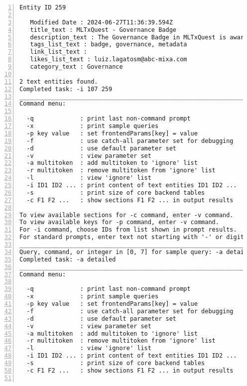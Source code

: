 \documentclass[10pt]{article}
\begin{document}
{\begin{lstlisting}[numbers=left,basicstyle=\ttfamily\footnotesize, frame=none]
Entity ID 259

   Modified Date : 2024-06-27T11:36:39.594Z
   title_text : MLTxQuest - Governance Badge
   description_text : The Governance Badge in MLTxQuest is awarded to data assets (tables) that demonstrate exceptional metadata management and data quality. To earn this badge, tables must meet stringent criteria, including robust technical and business metadata descriptions, alongside maintaining a Fitness Index score above 90 consistently. This badge signifies a commitment to high data governance standards, providing users with confidence in data accuracy and transparency in its usage.
   tags_list_text : badge, governance, metadata
   link_list_text :
   likes_list_text : luiz.lagatosm@abc-mixa.com
   category_text : Governance

2 text entities found.
Completed task: -i 107 259
____________________________________________________________________
Command menu:

  -q             : print last non-command prompt
  -x             : print sample queries
  -p key value   : set frontendParams[key] = value
  -f             : use catch-all parameter set for debugging
  -d             : use default parameter set
  -v             : view parameter set
  -a multitoken  : add multitoken to 'ignore' list
  -r multitoken  : remove multitoken from 'ignore' list
  -l             : view 'ignore' list
  -i ID1 ID2 ... : print content of text entities ID1 ID2 ...
  -s             : print size of core backend tables
  -c F1 F2 ...   : show sections F1 F2 ... in output results

To view available sections for -c command, enter -v command.
To view available keys for -p command, enter -v command.
For -i command, choose IDs from list shown in prompt results.
For standard prompts, enter text not starting with '-' or digit.
____________________________________________________________________
Query, command, or integer in [0, 7] for sample query: -a detailed
Completed task: -a detailed
____________________________________________________________________
Command menu:

  -q             : print last non-command prompt
  -x             : print sample queries
  -p key value   : set frontendParams[key] = value
  -f             : use catch-all parameter set for debugging
  -d             : use default parameter set
  -v             : view parameter set
  -a multitoken  : add multitoken to 'ignore' list
  -r multitoken  : remove multitoken from 'ignore' list
  -l             : view 'ignore' list
  -i ID1 ID2 ... : print content of text entities ID1 ID2 ...
  -s             : print size of core backend tables
  -c F1 F2 ...   : show sections F1 F2 ... in output results


\end{lstlisting}}
\end{document}
